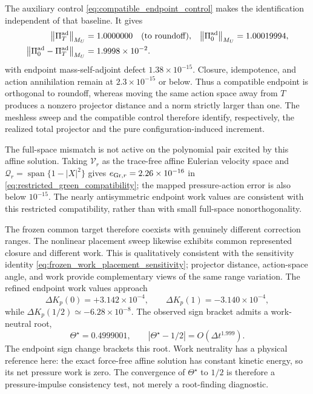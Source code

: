 \documentclass[11pt]{article}
\theoremstyle{plain}
\theoremstyle{definition}
\theoremstyle{remark}
\newcommand{\dt}{\Delta t}
\newcommand{\Th}{\Theta}
\newcommand{\norm}[2][]{\left\lVert #2\right\rVert_{#1}}
\begin{document}
The auxiliary control \eqref{eq:compatible_endpoint_control} makes the
identification independent of that baseline.  It gives
\begin{equation}
 \begin{aligned}
 \norm[M_U]{\Pi_T^{\rm ad}}&=1.0000000\quad\hbox{(to roundoff)},&
 \norm[M_U]{\Pi_0^{\rm ad}}&=1.00019994,\\
 \norm[M_U]{\Pi_0^{\rm ad}-\Pi_T^{\rm ad}}
 &=1.9998\times10^{-2}.&&
 \end{aligned}
 \label{eq:test1_compatible_projector_control}
\end{equation}
with endpoint mass-self-adjoint defect $1.38\times10^{-15}$.  Closure,
idempotence, and action annihilation remain at $2.3\times10^{-15}$ or below.
Thus a compatible endpoint is orthogonal to roundoff, whereas moving the same
action space away from $T$ produces a nonzero projector distance and a norm
strictly larger than one.  The meshless sweep and the compatible control
therefore identify, respectively, the realized total projector and the pure
configuration-induced increment.

The full-space mismatch is not active on the polynomial pair excited by this
affine solution.  Taking $\mathcal V_r$ as the trace-free affine Eulerian
velocity space and
$\mathcal Q_r=\operatorname{span}\{1-|X|^2\}$ gives
$e_{{\rm Gr},r}=2.26\times10^{-16}$ in
\eqref{eq:restricted_green_compatibility}; the mapped pressure-action error is
also below $10^{-15}$.  The nearly antisymmetric endpoint work values are
consistent with this restricted compatibility, rather than with small
full-space nonorthogonality.

The frozen common target therefore coexists with genuinely different
correction ranges.  The nonlinear placement sweep likewise exhibits common
represented closure and different work.  This is qualitatively consistent with
the sensitivity identity \eqref{eq:frozen_work_placement_sensitivity};
projector distance, action-space angle, and work provide complementary views
of the same range variation.  The refined endpoint work values approach
\begin{equation}
 \Delta K_p(0)=+3.142\times10^{-4},
 \qquad
 \Delta K_p(1)=-3.140\times10^{-4},
 \label{eq:test1_endpoint_work_values}
\end{equation}
while $\Delta K_p(1/2)\simeq-6.28\times10^{-8}$.  The observed sign bracket
admits a work-neutral root,
\begin{equation}
 \Th^\star=0.4999001,
 \qquad
 |\Th^\star-1/2|=O(\dt^{1.999}).
 \label{eq:test1_work_neutral_placement}
\end{equation}
The endpoint sign change brackets this root.  Work neutrality has a physical reference here: the
exact force-free affine solution has constant kinetic energy, so its net
pressure work is zero.  The convergence of $\Th^\star$ to $1/2$ is therefore a
pressure-impulse consistency test, not merely a root-finding diagnostic.
\end{document}
